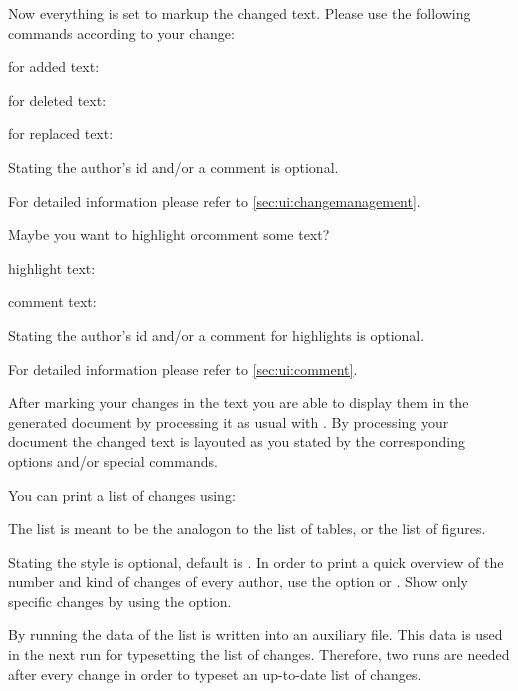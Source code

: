 
Now everything is set to markup the changed text.
Please use the following commands according to your change:

for added text:


for deleted text:


for replaced text:


Stating the author's id and/or a comment is optional.

For detailed information please refer to \autoref{sec:ui:changemanagement}.



Maybe you want to highlight orcomment some text?

highlight text:


comment text:


Stating the author's id and/or a comment for highlights is optional.

For detailed information please refer to \autoref{sec:ui:comment}.



After marking your changes in the text you are able to display them in the generated document by processing it as usual with .
By processing your document the changed text is layouted as you stated by the corresponding options and/or special commands.


You can print a list of changes using:


The list is meant to be the analogon to the list of tables, or the list of figures.

Stating the style is optional, default is .
In order to print a quick overview of the number and kind of changes of every author, use the option  or  .
Show only specific changes by using the  option.

By running  the data of the list is written into an auxiliary file.
This data is used in the next  run for typesetting the list of changes.
Therefore, two  runs are needed after every change in order to typeset an up-to-date list of changes.


